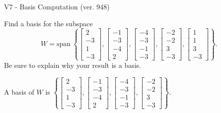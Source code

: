 \begin{exercise}
  \begin{exerciseTitle}V7 - Basis Computation (ver. 948)\end{exerciseTitle}
  \begin{exerciseStatement}
    Find a basis for the subspace 
\[W=\mathrm{span}\ \left\{\left[\begin{array}{r}
2 \\
-3 \\
1 \\
-3
\end{array}\right] , \left[\begin{array}{r}
-1 \\
-3 \\
-4 \\
2
\end{array}\right] , \left[\begin{array}{r}
-4 \\
-3 \\
-1 \\
-3
\end{array}\right] , \left[\begin{array}{r}
-2 \\
-2 \\
3 \\
-3
\end{array}\right] , \left[\begin{array}{r}
1 \\
1 \\
3 \\
-3
\end{array}\right]\right\}.\]
 Be sure to explain why your result is a basis.


  \end{exerciseStatement}
  \begin{exerciseAnswer}
   A basis of \(W\) is  \(\left\{\left[\begin{array}{r}
2 \\
-3 \\
1 \\
-3
\end{array}\right] , \left[\begin{array}{r}
-1 \\
-3 \\
-4 \\
2
\end{array}\right] , \left[\begin{array}{r}
-4 \\
-3 \\
-1 \\
-3
\end{array}\right] , \left[\begin{array}{r}
-2 \\
-2 \\
3 \\
-3
\end{array}\right]\right\}\).
  


  \end{exerciseAnswer}
\end{exercise}